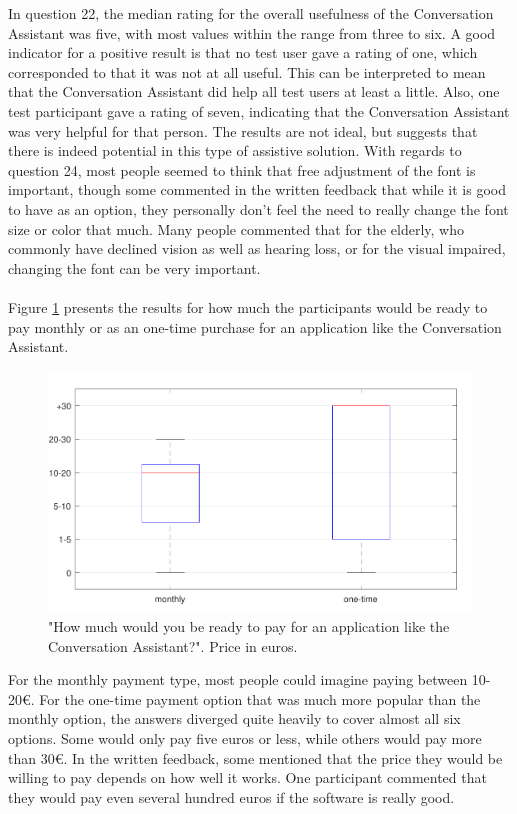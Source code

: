 \documentclass[english, 12pt, a4paper, pdftex, elec, utf8]{aaltothesis}
\begin{document}
In question 22, the median rating for the overall usefulness of the Conversation Assistant was five, with most values within the range from three to six. A good indicator for a positive result is that no test user gave a rating of one, which corresponded to that it was not at all useful. This can be interpreted to mean that the Conversation Assistant did help all test users at least a little. Also, one test participant gave a rating of seven, indicating that the Conversation Assistant was very helpful for that person. The results are not ideal, but suggests that there is indeed potential in this type of assistive solution. With regards to question 24, most people seemed to think that free adjustment of the font is important, though some commented in the written feedback that while it is good to have as an option, they personally don't feel the need to really change the font size or color that much. Many people commented that for the elderly, who commonly have declined vision as well as hearing loss, or for the visual impaired, changing the font can be very important. \\\\
Figure \ref{fig:results5} presents the results for how much the participants would be ready to pay monthly or as an one-time purchase for an application like the Conversation Assistant.
\begin{figure}[h!]
	\centering
	\includegraphics[width=\textwidth]{T2_box5.pdf}
	\caption{"How much would you be ready to pay for an application like the Conversation Assistant?". Price in euros.}
	\label{fig:results5} 
\end{figure}
For the monthly payment type, most people could imagine paying between 10-20€. For the one-time payment option that was much more popular than the monthly option, the answers diverged quite heavily to cover almost all six options. Some would only pay five euros or less, while others would pay more than 30€. In the written feedback, some mentioned that the price they would be willing to pay depends on how well it works. One participant commented that they would pay even several hundred euros if the software is really good. \\\\
\end{document}
